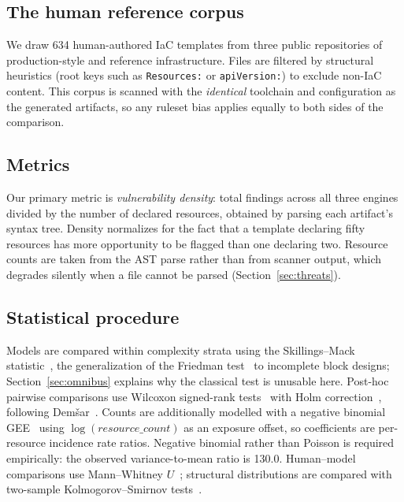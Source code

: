 \documentclass[conference]{IEEEtran}
\begin{document}
\subsection{The human reference corpus}
\label{sec:corpus}
We draw 634 human-authored IaC templates from three public repositories of
production-style and reference infrastructure. Files are filtered by structural
heuristics (root keys such as \texttt{Resources:} or \texttt{apiVersion:}) to
exclude non-IaC content. This corpus is scanned with the \emph{identical}
toolchain and configuration as the generated artifacts, so any ruleset bias
applies equally to both sides of the comparison.

\subsection{Metrics}
Our primary metric is \emph{vulnerability density}: total findings across all
three engines divided by the number of declared resources, obtained by parsing
each artifact's syntax tree. Density normalizes for the fact that a template
declaring fifty resources has more opportunity to be flagged than one declaring
two. Resource counts are taken from the AST parse rather than from scanner
output, which degrades silently when a file cannot be parsed
(Section~\ref{sec:threats}).

\subsection{Statistical procedure}
Models are compared within complexity strata using the Skillings--Mack
statistic~\cite{skillings1981distribution}, the generalization of the Friedman
test~\cite{friedman1937use} to incomplete block designs; Section~\ref{sec:omnibus}
explains why the classical test is unusable here. Post-hoc pairwise comparisons
use Wilcoxon signed-rank tests~\cite{wilcoxon1945individual} with Holm
correction~\cite{holm1979simple}, following Dem\v{s}ar~\cite{demsar2006statistical}.
Counts are additionally modelled with a negative binomial
GEE~\cite{liang1986longitudinal,hilbe2011negative} using
$\log(\textit{resource\_count})$ as an exposure offset, so coefficients are
per-resource incidence rate ratios. Negative binomial rather than Poisson is
required empirically: the observed variance-to-mean ratio is 130.0.
Human--model comparisons use Mann--Whitney $U$~\cite{mann1947test}; structural
distributions are compared with two-sample Kolmogorov--Smirnov
tests~\cite{massey1951kolmogorov}.
\end{document}
